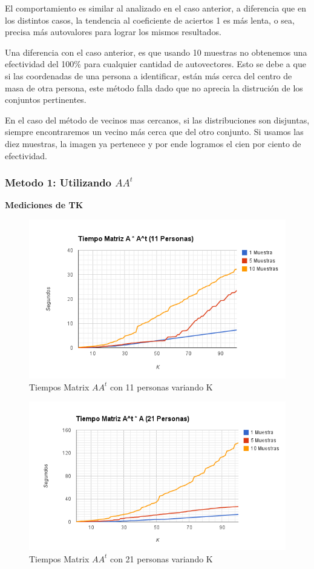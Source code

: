 El comportamiento es similar al analizado en el caso anterior, a diferencia que en los distintos casos, la tendencia al coeficiente de aciertos 1 es m\'as lenta, o sea, precisa m\'as autovalores para lograr los mismos resultados.

Una diferencia con el caso anterior, es que usando 10 muestras no obtenemos una efectividad del 100\% para cualquier cantidad de autovectores. Esto se debe a que si las coordenadas de una persona a identificar, est\'an m\'as cerca del centro de masa de otra persona, este m\'etodo falla dado que no aprecia la distruci\'on de los conjuntos pertinentes.

En el caso del m\'etodo de vecinos mas cercanos, si las distribuciones son disjuntas, siempre encontraremos un vecino m\'as cerca que del otro conjunto. Si usamos las diez muestras, la imagen ya pertenece y por ende logramos el cien por ciento de efectividad.


\subsubsection{Metodo 1: Utilizando $AA^t$}

\textbf{Mediciones de TK }

\begin{figure}[H]
\includegraphics[width=1\textwidth]{img/imagea.png}
     \caption{Tiempos Matrix $AA^t$ con 11 personas variando K}
\end{figure}

\begin{figure}[H]
\includegraphics[width=1\textwidth]{img/imageb.png}
     \caption{Tiempos Matrix $AA^t$ con 21 personas variando K}
\end{figure}

